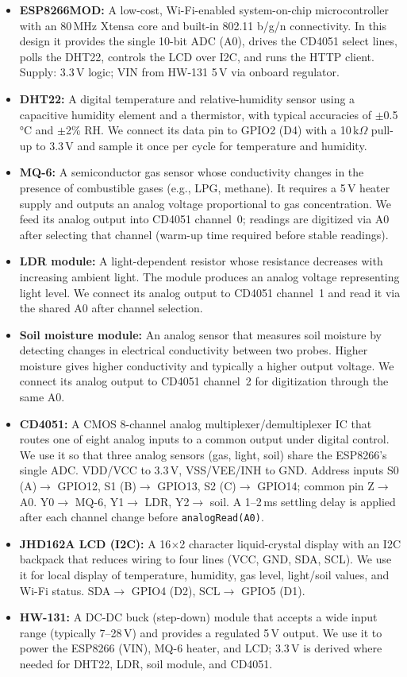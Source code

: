 \documentclass[journal,onecolumn]{IEEEtran}
\begin{document}
\begin{itemize}
    \item \textbf{ESP8266MOD:} A low-cost, Wi-Fi-enabled system-on-chip microcontroller with an 80\,MHz Xtensa core and built-in 802.11 b/g/n connectivity. In this design it provides the single 10-bit ADC (A0), drives the CD4051 select lines, polls the DHT22, controls the LCD over I2C, and runs the HTTP client. Supply: 3.3\,V logic; VIN from HW-131 5\,V via onboard regulator.
    \item \textbf{DHT22:} A digital temperature and relative-humidity sensor using a capacitive humidity element and a thermistor, with typical accuracies of $\pm$0.5\,°C and $\pm$2\% RH. We connect its data pin to GPIO2 (D4) with a 10\,k$\Omega$ pull-up to 3.3\,V and sample it once per cycle for temperature and humidity.
    \item \textbf{MQ-6:} A semiconductor gas sensor whose conductivity changes in the presence of combustible gases (e.g., LPG, methane). It requires a 5\,V heater supply and outputs an analog voltage proportional to gas concentration. We feed its analog output into CD4051 channel~0; readings are digitized via A0 after selecting that channel (warm-up time required before stable readings).
    \item \textbf{LDR module:} A light-dependent resistor whose resistance decreases with increasing ambient light. The module produces an analog voltage representing light level. We connect its analog output to CD4051 channel~1 and read it via the shared A0 after channel selection.
    \item \textbf{Soil moisture module:} An analog sensor that measures soil moisture by detecting changes in electrical conductivity between two probes. Higher moisture gives higher conductivity and typically a higher output voltage. We connect its analog output to CD4051 channel~2 for digitization through the same A0.
    \item \textbf{CD4051:} A CMOS 8-channel analog multiplexer/demultiplexer IC that routes one of eight analog inputs to a common output under digital control. We use it so that three analog sensors (gas, light, soil) share the ESP8266's single ADC. VDD/VCC to 3.3\,V, VSS/VEE/INH to GND. Address inputs S0 (A)$\to$ GPIO12, S1 (B)$\to$ GPIO13, S2 (C)$\to$ GPIO14; common pin Z$\to$ A0. Y0$\to$ MQ-6, Y1$\to$ LDR, Y2$\to$ soil. A 1--2\,ms settling delay is applied after each channel change before \texttt{analogRead(A0)}.
    \item \textbf{JHD162A LCD (I2C):} A 16$\times$2 character liquid-crystal display with an I2C backpack that reduces wiring to four lines (VCC, GND, SDA, SCL). We use it for local display of temperature, humidity, gas level, light/soil values, and Wi-Fi status. SDA$\to$ GPIO4 (D2), SCL$\to$ GPIO5 (D1).
    \item \textbf{HW-131:} A DC-DC buck (step-down) module that accepts a wide input range (typically 7--28\,V) and provides a regulated 5\,V output. We use it to power the ESP8266 (VIN), MQ-6 heater, and LCD; 3.3\,V is derived where needed for DHT22, LDR, soil module, and CD4051.
\end{itemize}
\end{document}
